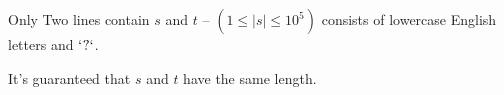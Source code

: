 Only Two lines contain $s$ and $t$ -- $(1 \le |s| \le 10^5)$ consists of lowercase English letters and $\bf{`?`}$.

It's guaranteed that $s$ and $t$ have the same length.